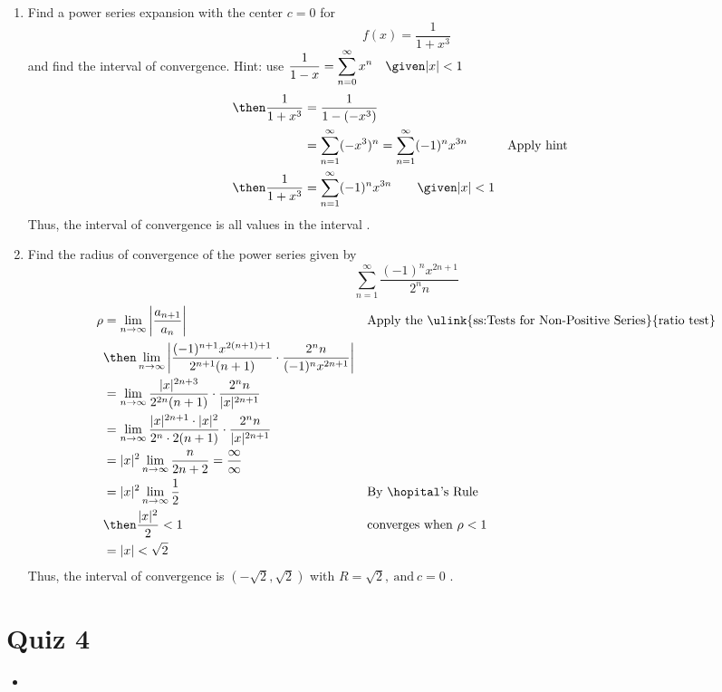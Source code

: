 \begin{enumerate}
\newpage %

  \item Find a power series expansion with the center \(c = 0 \) for
     \[%
     f(x) = \frac{1}{1+x^3}
     \]%
     and find the interval of convergence. Hint: use \(\displaystyle \frac{1}{1-x} = \sum_{n=0}^{\infty} x^n \quad \given |x| < 1 \)
     \begin{align*}
       \then \frac{1}{1+x^3} &= \frac{1}{1 - (-x^3)} \\
       &= \sum_{n=1}^{\infty} (-x^3)^n = \sum_{n=1}^{\infty} (-1)^nx^{3n}
       && \text{Apply hint} \\
       \then \frac{1}{1+x^3} &= \sum_{n=1}^{\infty} (-1)^n x^{3n} \qquad \given |x| < 1
     \end{align*}
     Thus, the interval of convergence is all values in the interval .

  \vspace{6em}

  \item Find the radius of convergence of the power series given by
    \[%
    \sum_{n=1}^{\infty} \frac{(-1)^n x^{2n+1} }{2^n n}
    \]%
    \begin{align*}
      \rho &= \lim_{n \to \infty} \left| \frac{a_{n+1}}{a_n}  \right|
           && \text{Apply the \ulink{ss:Tests for Non-Positive Series}{ratio test}} \\
           &\then \lim_{n \to \infty}
           \left| \frac{(-1)^{n+1} x^{2(n+1)+1}}{2^{n+1}(n+1)}
           \cdot \frac{2^n n}{(-1)^n x^{2n+1} }
           \right| \\
           &= \lim_{n \to \infty} \frac{|x|^{2n+3}}{2^{2n}(n+1)}
           \cdot \frac{2^n n}{|x|^{2n+1} } \\
           &= \lim_{n \to \infty} \frac{|x|^{2n+1} \cdot |x|^2}{2^n \cdot 2(n+1)}
           \cdot \frac{2^n n}{|x|^{2n+1} } \\
           &= |x|^2 \lim_{n \to \infty} \frac{n}{2n+2} = \frac{\infty}{\infty}\\
           &= |x|^2 \lim_{n \to \infty} \frac{1}{2}
           && \text{By \hopital's Rule} \\
           &\then \frac{|x|^2}{2} < 1
           && \text{converges when}~\rho < 1 \\
           &= |x| < \sqrt{2}
    \end{align*}
    Thus, the interval of convergence is \((-\sqrt{2}, \sqrt{2})\) with \(R = \sqrt{2}, ~\text{and}~c = 0\)
    .

\end{enumerate}

\section{Quiz 4}
\begin{itemize}
  \item
\end{itemize}

